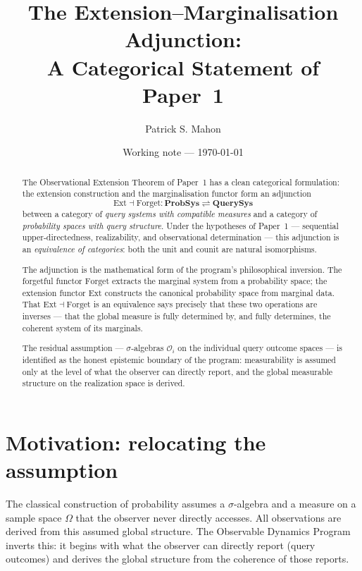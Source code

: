 \documentclass[11pt]{article}
\title{
The Extension--Marginalisation Adjunction:\\
A Categorical Statement of Paper~1
}
\author{Patrick S. Mahon}
\date{Working note --- \today}
\newcommand{\QSys}{\mathbf{QuerySys}}
\newcommand{\PSys}{\mathbf{ProbSys}}
\newcommand{\Ext}{\mathrm{Ext}}
\newcommand{\Forget}{\mathrm{Forget}}
\begin{document}
\maketitle

\begin{abstract}
The Observational Extension Theorem of Paper~1 has a clean categorical
formulation: the extension construction and the marginalisation functor
form an adjunction
\[
  \Ext \dashv \Forget : \PSys \rightleftharpoons \QSys
\]
between a category of \emph{query systems with compatible measures} and a
category of \emph{probability spaces with query structure}.  Under the
hypotheses of Paper~1 --- sequential upper-directedness, realizability, and
observational determination --- this adjunction is an \emph{equivalence of
categories}: both the unit and counit are natural isomorphisms.

The adjunction is the mathematical form of the program's philosophical
inversion.  The forgetful functor $\Forget$ extracts the marginal system from
a probability space; the extension functor $\Ext$ constructs the canonical
probability space from marginal data.  That $\Ext \dashv \Forget$ is an
equivalence says precisely that these two operations are inverses --- that
the global measure is fully determined by, and fully determines, the
coherent system of its marginals.

The residual assumption --- $\sigma$-algebras $\mathcal{O}_i$ on the
individual query outcome spaces --- is identified as the honest epistemic
boundary of the program: measurability is assumed only at the level of what
the observer can directly report, and the global measurable structure on the
realization space is derived.
\end{abstract}

\tableofcontents

\section{Motivation: relocating the assumption}
\label{sec:motivation}

The classical construction of probability assumes a $\sigma$-algebra and a
measure on a sample space $\Omega$ that the observer never directly accesses.
All observations are derived from this assumed global structure.  The
Observable Dynamics Program inverts this: it begins with what the observer
can directly report (query outcomes) and derives the global structure from
the coherence of those reports.
\end{document}
